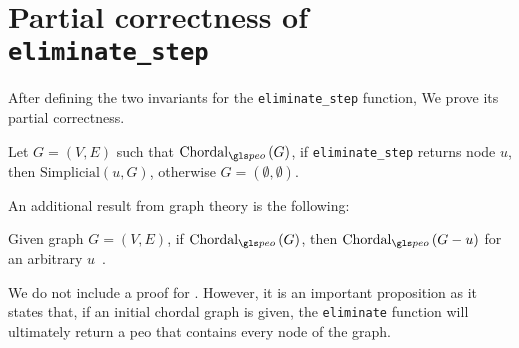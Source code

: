 \section{Partial correctness of \texttt{eliminate\_step}}

After defining the two invariants for the \texttt{eliminate\_step} function, We prove its partial correctness.

\begin{theorem}\label{thm:par-cor}
    Let $G = (V, E)$ such that $\chordalpeo{G}$, if \texttt{eliminate\_step} returns node $u$, then $\mathrm{Simplicial}(u, G)$, otherwise $G = (\emptyset, \emptyset)$. \Coqed
\end{theorem}

An additional result from graph theory is the following:

\begin{theorem}\label{thm:cho-inv}
    Given graph $G = (V, E)$, if $\chordalpeo{G}$, then $\chordalpeo{G - u}$ for an arbitrary $u$~\cite{golumbic2004algorithmic}.
\end{theorem}

We do not include a proof for . However, it is an important proposition as it states that, if an initial chordal graph is given, the \texttt{eliminate} function will ultimately return a \gls{peo} that contains every node of the graph.